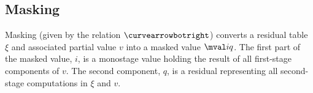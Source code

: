 \begin{abstrsyn}
\subsection{Masking}
\label{sec:masking}


Masking (given by the relation $\vsplito$) converts a residual table $\xi$
and associated partial value $v$ into a masked value $\mval i q$.
The first part of the masked value, $i$, is a monostage value holding
the result of all first-stage components of $v$.  The second
component, $q$, is a residual representing all second-stage
computations in $\xi$ and $v$.



\end{abstrsyn}
